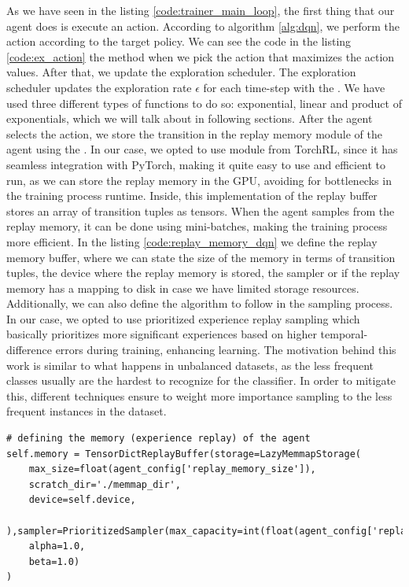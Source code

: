 As we have seen in the listing \ref{code:trainer_main_loop}, the first thing that our agent does is execute an action. According to algorithm \ref{alg:dqn}, we perform the action according to the target policy. We can see the code in the listing \ref{code:ex_action} the  method when we pick the action that maximizes the action values. After that, we update the exploration scheduler. The exploration scheduler updates the exploration rate $\epsilon$ for each time-step with the . We have used three different types of functions to do so: exponential, linear and product of exponentials, which we will talk about in following sections. After the agent selects the action, we store the transition in the replay memory module of the agent using the . In our case, we opted to use  module from TorchRL, since it has seamless integration with PyTorch, making it quite easy to use and efficient to run, as we can store the replay memory in the GPU, avoiding for bottlenecks in the training process runtime. Inside, this implementation of the replay buffer stores an array of transition tuples as tensors. When the agent samples from the replay memory, it can be done using mini-batches, making the training process more efficient. In the listing \ref{code:replay_memory_dqn} we define the replay memory buffer, where we can state the size of the memory in terms of transition tuples, the device where the replay memory is stored, the sampler or if the replay memory has a mapping to disk in case we have limited storage resources. Additionally, we can also define the algorithm to follow in the sampling process. In our case, we opted to use prioritized experience replay sampling \cite{schaul2016prioritized} which basically prioritizes more significant experiences based on higher temporal-difference errors during training, enhancing learning. The motivation behind this work is similar to what happens in unbalanced datasets, as the less frequent classes usually are the hardest to recognize for the classifier. In order to mitigate this, different techniques ensure to weight more importance sampling to the less frequent instances in the dataset. 

\begin{lstlisting}[caption={Code snippet for the replay memory of the DQN agent}, label={code:replay_memory_dqn}]
# defining the memory (experience replay) of the agent
self.memory = TensorDictReplayBuffer(storage=LazyMemmapStorage(
	max_size=float(agent_config['replay_memory_size']),
	scratch_dir='./memmap_dir',
	device=self.device,
	),sampler=PrioritizedSampler(max_capacity=int(float(agent_config['replay_memory_size'])), 
	alpha=1.0, 
	beta=1.0)
)
\end{lstlisting}

